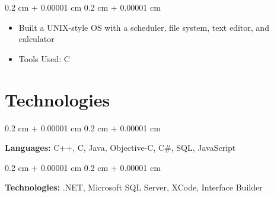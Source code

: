 \documentclass[10pt, letterpaper]{article}
\newenvironment{highlights}{
    \begin{itemize}[
        topsep=0.10 cm,
        parsep=0.10 cm,
        partopsep=0pt,
        itemsep=0pt,
        leftmargin=0.4 cm + 10pt
    ]
}{
    \end{itemize}
} %
\newenvironment{onecolentry}{
    \begin{adjustwidth}{
        0.2 cm + 0.00001 cm
    }{
        0.2 cm + 0.00001 cm
    }
}{
    \end{adjustwidth}
} %
\begin{document}
\vspace{0.10 cm}
\begin{onecolentry}
    \begin{highlights}
        \item Built a UNIX-style OS with a scheduler, file system, text editor, and calculator
        \item Tools Used: C
    \end{highlights}
\end{onecolentry}




\section{Technologies}




\begin{onecolentry}
    \textbf{Languages:} C++, C, Java, Objective-C, C\#, SQL, JavaScript
\end{onecolentry}

\vspace{0.2 cm}

\begin{onecolentry}
    \textbf{Technologies:} .NET, Microsoft SQL Server, XCode, Interface Builder
\end{onecolentry}
\end{document}
